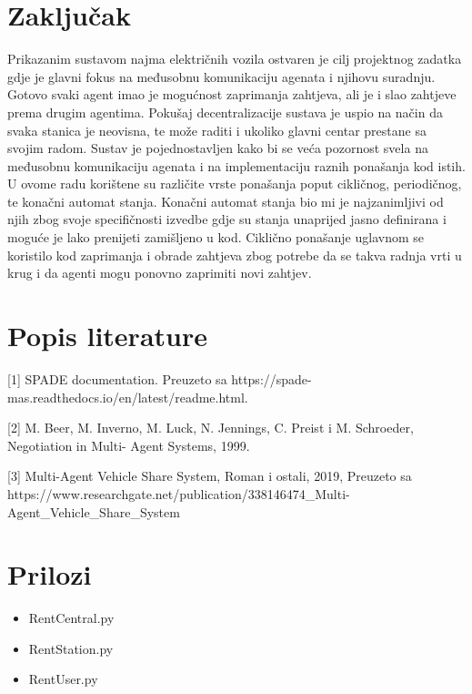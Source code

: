 \documentclass{foi}
\begin{document}
\chapter{Zaključak}

Prikazanim sustavom najma električnih vozila ostvaren je cilj projektnog zadatka gdje je glavni fokus na međusobnu komunikaciju agenata i njihovu suradnju. Gotovo svaki agent imao je mogućnost zaprimanja zahtjeva, ali je i slao zahtjeve prema drugim agentima. Pokušaj decentralizacije sustava je uspio na način da svaka stanica je neovisna, te može raditi i ukoliko glavni centar prestane sa svojim radom. Sustav je pojednostavljen kako bi se veća pozornost svela na međusobnu komunikaciju agenata i na implementaciju raznih ponašanja kod istih. U ovome radu korištene su različite vrste ponašanja poput cikličnog, periodičnog, te konačni automat stanja. Konačni automat stanja bio mi je najzanimljivi od njih zbog svoje specifičnosti izvedbe gdje su stanja unaprijed jasno definirana i moguće je lako prenijeti zamišljeno u kod. Ciklično ponašanje uglavnom se koristilo kod zaprimanja i obrade zahtjeva zbog potrebe da se takva radnja vrti u krug i da agenti mogu ponovno zaprimiti novi zahtjev. 

\chapter{Popis literature}

[1] SPADE documentation. Preuzeto sa https://spade-mas.readthedocs.io/en/latest/readme.html.

[2] M. Beer, M. Inverno, M. Luck, N. Jennings, C. Preist i M. Schroeder, Negotiation in Multi- Agent Systems, 1999.

[3] Multi-Agent Vehicle Share System, Roman i ostali, 2019, Preuzeto sa https://www.researchgate.net/publication/338146474\_Multi-Agent\_Vehicle\_Share\_System

\printbibliography[title=Popis literature]

\listoffigures
{}

\appendix
\renewcommand{\thechapter}{\arabic{chapter}}

\chapter{Prilozi}

\begin{itemize}
    \item RentCentral.py
    
    \item RentStation.py
    
    \item RentUser.py
\end{itemize}
\end{document}

